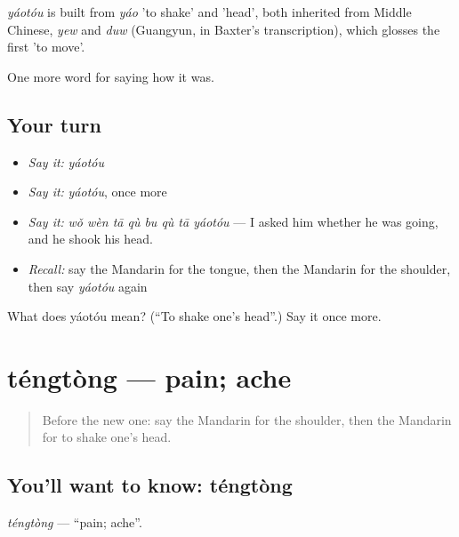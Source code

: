 \begin{cousinweb}
\emph{yáotóu} is built from \emph{yáo} 'to shake' and  'head', both inherited from Middle Chinese, \emph{yew} and \emph{duw} (Guangyun, in Baxter's transcription), which glosses the first 'to move'.
\end{cousinweb}

\begin{grammarlens}[title={What you've built}]
One more word for saying how it was.
\end{grammarlens}

\subsection*{Your turn}
\begin{itemize}
\raggedright
  \item \emph{Say it:} \emph{yáotóu}
  \item \emph{Say it:} \emph{yáotóu}, once more
  \item \emph{Say it:} \emph{wǒ wèn tā qù bu qù tā yáotóu} — I asked him whether he was going, and he shook his head.
  \item \emph{Recall:} say the Mandarin for the tongue, then the Mandarin for the shoulder, then say \emph{yáotóu} again
\end{itemize}

\begin{tcolorbox}[breakable,colback=teal!4,colframe=teal!35!black,title={Before you move on}]
What does yáotóu mean? (\textquotedblleft{}To shake one's head\textquotedblright{}.) Say it once more.
\end{tcolorbox}
\section[téngtòng]{téngtòng — pain; ache}

\label{lesson:ZH-C476-tengtong}



\begin{quote}
Before the new one: say the Mandarin for the shoulder, then the Mandarin for to shake one's head.
\end{quote}

\subsection*{You'll want to know: téngtòng}
\emph{téngtòng} — \textquotedblleft{}pain; ache\textquotedblright{}.

